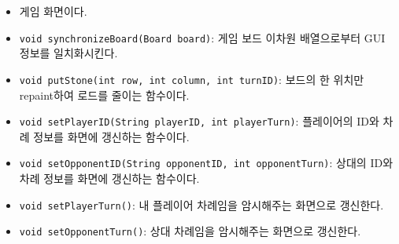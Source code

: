 \documentclass[a4paper, 10pt]{article}
\begin{document}
\begin{itemize}
  \begin{itemize}
    \item[] 게임 화면이다.
    \item \texttt{void synchronizeBoard(Board board)}: 게임 보드 이차원 배열으로부터 GUI 정보를 일치화시킨다.
    \item \texttt{void putStone(int row, int column, int turnID)}: 보드의 한 위치만 repaint하여 로드를 줄이는 함수이다.
    \item \texttt{void setPlayerID(String playerID, int playerTurn)}: 플레이어의 ID와 차례 정보를 화면에 갱신하는 함수이다.
    \item \texttt{void setOpponentID(String opponentID, int opponentTurn)}: 상대의 ID와 차례 정보를 화면에 갱신하는 함수이다.
    \item \texttt{void setPlayerTurn()}: 내 플레이어 차례임을 암시해주는 화면으로 갱신한다.
    \item \texttt{void setOpponentTurn()}: 상대 차례임을 암시해주는 화면으로 갱신한다.
  \end{itemize}
\end{itemize}
\end{document}
